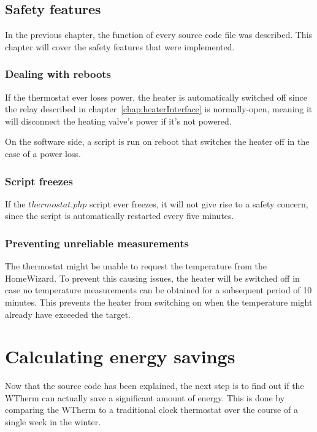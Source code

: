 \documentclass[12pt,a4paper,final]{report}
\begin{document}
\chapter{Safety features} \label{chap:safety}
In the previous chapter, the function of every source code file was described. This chapter will cover the safety features that were implemented.
\section{Dealing with reboots}
If the thermostat ever loses power, the heater is automatically switched off since the relay described in chapter~\ref{chap:heaterInterface} is normally-open, meaning it will disconnect the heating valve's power if it's not powered.

On the software side, a script is run on reboot that switches the heater off in the case of a power loss.

\section{Script freezes}
If the $thermostat.php$ script ever freezes, it will not give rise to a safety concern, since the script is automatically restarted every five minutes.

\section{Preventing unreliable measurements}
The thermostat might be unable to request the temperature from the HomeWizard. To prevent this causing issues, the heater will be switched off in case no temperature measurements can be obtained for a subsequent period of 10 minutes. This prevents the heater from switching on when the temperature might already have exceeded the target.

\part{Calculating energy savings} \label{part:CalculateSavings}
Now that the source code has been explained, the next step is to find out if the WTherm can actually save a significant amount of energy. This is done by comparing the WTherm to a traditional clock thermostat over the course of a single week in the winter.
\end{document}
